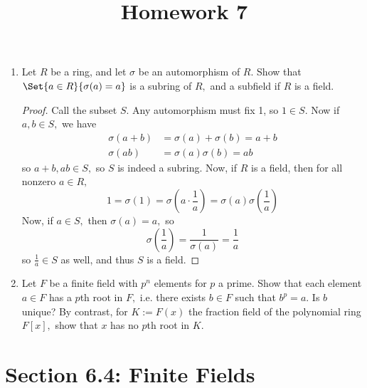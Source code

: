 \documentclass{article}
\begin{document}
\title{Homework 7}
\maketitle
\thispagestyle{fancy}

\begin{enumerate}
	\item Let $R$ be a ring, and let $\sigma$ be an automorphism of $R.$ Show that $\Set{a\in R}{\sigma(a)=a}$ is a subring of $R,$ and a subfield if $R$ is a field.
		\begin{proof}
			Call the subset $S.$ Any automorphism must fix 1, so $1\in S.$ Now if $a, b\in S,$ we have
			\begin{align*}
				\sigma(a+b) &= \sigma(a)+\sigma(b) = a+b \\
				\sigma(ab) &= \sigma(a)\sigma(b)=ab
			\end{align*}
			so $a+b, ab\in S,$ so $S$ is indeed a subring. Now, if $R$ is a field, then for all nonzero $a\in R,$
			\[1=\sigma(1)=\sigma\left( a\cdot \frac{1}{a} \right) = \sigma(a) \sigma\left( \frac{1}{a} \right)\]
			Now, if $a\in S,$ then $\sigma(a)=a,$ so
			\[\sigma\left( \frac{1}{a} \right) = \frac{1}{\sigma(a)}=\frac{1}{a}\]
			so $\frac{1}{a}\in S$ as well, and thus $S$ is a field.
		\end{proof}

	\item Let $F$ be a finite field with $p^n$ elements for $p$ a prime. Show that each element $a\in F$ has a $p$th root in $F,$ i.e. there exists $b\in F$ such that $b^p=a.$ Is $b$ unique? By contrast, for $K:=F(x)$ the fraction field of the polynomial ring $F[x],$ show that $x$ has no $p$th root in $K.$
		
\end{enumerate}

\section*{Section 6.4: Finite Fields}
\end{document}
